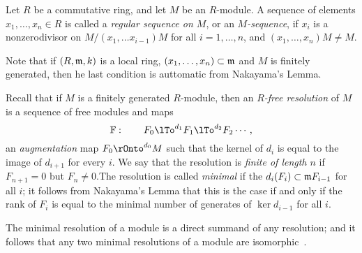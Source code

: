 \begin{definition}
 Let $R$ be a commutative ring, and let $M$ be an $R$-module. A sequence of
 elements $x_{1}, \dots, x_{n}\in R$ is called a \emph{regular sequence on $M$}, or an
 \emph{$M$-sequence}, if
 $x_{i}$ is a nonzerodivisor on $M/(x_{1}, \dots x_{i-1})M$  for all $i= 1,\dots, n$, and 
 $(x_{1}, \dots, x_{n})M \neq M$.
\end{definition}

Note that if $(R,\gm,k)$ is a local ring, $(x_{1},\dots,x_{n})\subset \gm$ and $M$ is finitely generated, then he last condition is auttomatic from Nakayama's Lemma.

 Recall
that if $M$ is a finitely generated $R$-module, then an \emph{$R$-free resolution} of $M$ is a sequence of free modules and maps
$$
\FF:\qquad F_{0} \lTo^{d_{1}} F_{1}\lTo^{d_{2}} F_{2}\cdots,
$$
an \emph{augmentation} map $F_{0} \rOnto^{d_{0}} M$ such that the kernel of $d_{i}$ is equal to the image of $d_{i+1}$ for every $i$. We say that the resolution is \emph{finite of length $n$} if $F_{n+1}= 0$ but $F_{n}\neq 0$.The resolution is called \emph{minimal} if the $d_{i}(F_{i}) \subset \gm F_{i-1}$ for all $i$; it follows from Nakayama's Lemma that this is the case if and only if the rank of $F_{i}$ is equal to the minimal
number of generates of $\ker d_{i-1}$ for all $i$. 

The minimal resolution of a module is a direct summand of any resolution; and it follows that any two minimal resolutions of a module are isomorphic~\cite[Theorem ***]{E}. 

